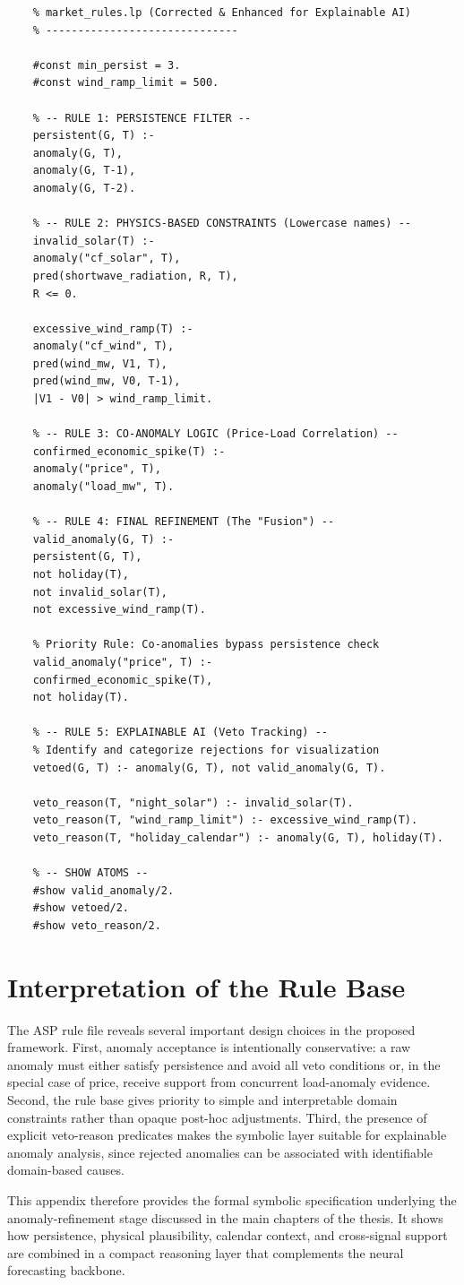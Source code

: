 \begin{lstlisting}[caption={market\_rules.lp (Corrected \& Enhanced for Explainable AI)}]
	% ------------------------------
	% market_rules.lp (Corrected & Enhanced for Explainable AI)
	% ------------------------------
	
	#const min_persist = 3.
	#const wind_ramp_limit = 500.
	
	% -- RULE 1: PERSISTENCE FILTER --
	persistent(G, T) :- 
	anomaly(G, T), 
	anomaly(G, T-1), 
	anomaly(G, T-2).
	
	% -- RULE 2: PHYSICS-BASED CONSTRAINTS (Lowercase names) --
	invalid_solar(T) :- 
	anomaly("cf_solar", T),
	pred(shortwave_radiation, R, T),
	R <= 0.
	
	excessive_wind_ramp(T) :-
	anomaly("cf_wind", T),
	pred(wind_mw, V1, T),
	pred(wind_mw, V0, T-1),
	|V1 - V0| > wind_ramp_limit.
	
	% -- RULE 3: CO-ANOMALY LOGIC (Price-Load Correlation) --
	confirmed_economic_spike(T) :-
	anomaly("price", T),
	anomaly("load_mw", T).
	
	% -- RULE 4: FINAL REFINEMENT (The "Fusion") --
	valid_anomaly(G, T) :-
	persistent(G, T),
	not holiday(T),
	not invalid_solar(T),
	not excessive_wind_ramp(T).
	
	% Priority Rule: Co-anomalies bypass persistence check
	valid_anomaly("price", T) :-
	confirmed_economic_spike(T),
	not holiday(T).
	
	% -- RULE 5: EXPLAINABLE AI (Veto Tracking) --
	% Identify and categorize rejections for visualization
	vetoed(G, T) :- anomaly(G, T), not valid_anomaly(G, T).
	
	veto_reason(T, "night_solar") :- invalid_solar(T).
	veto_reason(T, "wind_ramp_limit") :- excessive_wind_ramp(T).
	veto_reason(T, "holiday_calendar") :- anomaly(G, T), holiday(T).
	
	% -- SHOW ATOMS --
	#show valid_anomaly/2.
	#show vetoed/2.
	#show veto_reason/2.
\end{lstlisting}

\section{Interpretation of the Rule Base}

The ASP rule file reveals several important design choices in the proposed framework. First, anomaly acceptance is intentionally conservative: a raw anomaly must either satisfy persistence and avoid all veto conditions or, in the special case of price, receive support from concurrent load-anomaly evidence. Second, the rule base gives priority to simple and interpretable domain constraints rather than opaque post-hoc adjustments. Third, the presence of explicit veto-reason predicates makes the symbolic layer suitable for explainable anomaly analysis, since rejected anomalies can be associated with identifiable domain-based causes.

This appendix therefore provides the formal symbolic specification underlying the anomaly-refinement stage discussed in the main chapters of the thesis. It shows how persistence, physical plausibility, calendar context, and cross-signal support are combined in a compact reasoning layer that complements the neural forecasting backbone.
